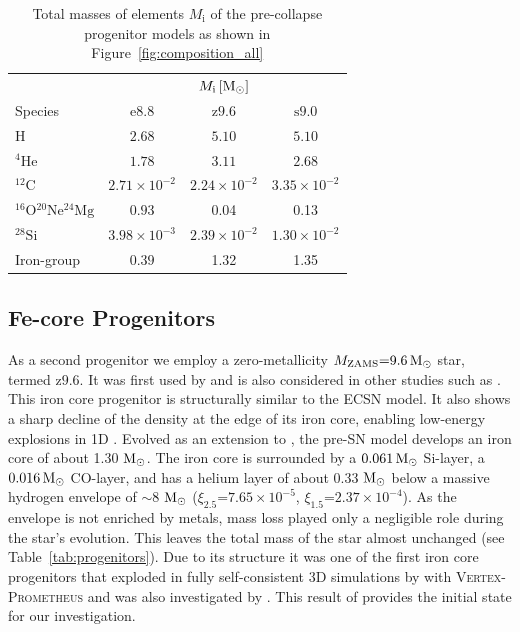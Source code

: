 \documentclass[fleqn,usenatbib]{mnras}
\newcommand{\helium}{\ensuremath{\mathrm{^{4}He}}\xspace}
\newcommand{\carbon}{\ensuremath{\mathrm{^{12}C}}\xspace}
\newcommand{\oxygen}{\ensuremath{\mathrm{^{16}O}}\xspace}
\newcommand{\neon}{\ensuremath{\mathrm{^{20}Ne}}\xspace}
\newcommand{\magnesium}{\ensuremath{\mathrm{^{24}Mg}}\xspace}
\newcommand{\silicon}{\ensuremath{\mathrm{^{28}Si}}\xspace}
\newcommand{\solm}{\ensuremath{\rm{M_{\odot}}}\xspace}
\newcommand{\vertexprom}{\textsc{Vertex-Prometheus}\xspace}
\newcommand{\onemg}{\ensuremath{\mathrm{e8.8}}\xspace}
\newcommand{\snine}{\ensuremath{\mathrm{s9.0}}\xspace}
\newcommand{\znine}{\ensuremath{\mathrm{z9.6}}\xspace}
\begin{document}
\begin{table}
    \centering
    \caption{Total masses of elements $M_\mathrm{i}$ of the 
    pre-collapse progenitor models as shown in Figure~\ref{fig:composition_all}}
    \label{tab:progenitor total masses}
    \begin{tabular}{l|c c c}
        &
        \multicolumn{3}{c}{$M_\mathrm{i}\,[\solm] $}  \\
         Species &
        \onemg &
        \znine &
        \snine \\
         \hline 
            $\mathrm{H}$               & $2.68$              & $5.10$              & $5.10$              \\
            \helium                    & $1.78$              & $3.11$              & $2.68$              \\
            \carbon                    & $2.71\times10^{-2}$ & $2.24\times10^{-2}$ & $3.35\times10^{-2}$ \\
            $\oxygen\neon\magnesium$   & $0.93$              & 0.04                & 0.13                \\
            \silicon                   & $3.98\times10^{-3}$ & $2.39\times10^{-2}$ & $1.30\times10^{-2}$ \\
            Iron-group                 & $0.39$              & 1.32                & 1.35                \\
    \end{tabular}
\end{table}


\subsection{Fe-core Progenitors}
As a second progenitor we employ a zero-metallicity 
$M_{\text{ZAMS}}\mathord{=}9.6\,\solm$ star, termed \znine. 
It was first used by \citet{Janka2012} and is also considered in other 
studies such as \citet{Mueller2013,Mueller2018}. This iron core 
progenitor is structurally similar to the ECSN model. It also shows a 
sharp decline of the density at the edge of its iron core, enabling low-energy 
explosions in 1D \citep{Melson2015,Radice2017}. 
Evolved as an extension to \cite{Heger2010}, the pre-SN model develops an 
iron core of about 1.30 \solm. The iron core is surrounded by a $0.061\,\solm$ 
Si-layer, a $0.016\,\solm$ CO-layer, and has a helium layer of about 0.33
\solm below a massive hydrogen envelope of $\mathord{\sim}8$ \solm 
($\xi_{2.5}\mathord{=}7.65 \times 10^{-5}$, $\xi_{1.5}\mathord{=}2.37 \times 10^{-4}$).
As the envelope is not enriched by metals, mass loss played only a negligible 
role during the star's evolution. This leaves the total mass of the star 
almost unchanged (see Table~\ref{tab:progenitors}). 
Due to its structure it was one of the first iron core progenitors that exploded 
in fully self-consistent 3D simulations by \cite{Melson2015a} with \vertexprom and was also investigated by \cite{Radice2017,Mueller2019,Burrows2019}. 
This result of \cite{Melson2015a} provides the initial state for our investigation. 
\end{document}
